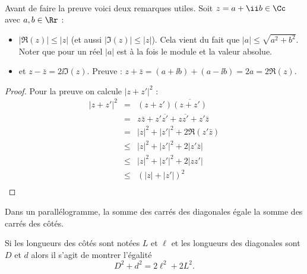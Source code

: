 \documentclass[class=report,crop=false]{standalone}
\begin{document}
\begin{proposition}\ 
\end{proposition}
Avant de faire la preuve voici deux remarques utiles. Soit $z = a +\ii b \in \Cc$ avec $a,b\in\Rr$ :
\begin{itemize}
  \item $|\Re(z)| \le |z|$ (et aussi $|\Im(z)| \le |z|$). Cela vient du fait que
  $|a| \le \sqrt{a^2+b^2}$. Noter que pour un réel $|a|$ est à la fois le module et la valeur absolue. 
  \item \myboxinline{$z+\bar{z} = 2\Re(z)$} et $z-\bar{z} = 2\ii\Im(z)$. Preuve :
  $z+\bar{z} = (a+\ii b)+ (a-\ii b) = 2a = 2\Re(z)$.
\end{itemize}

\begin{proof}
Pour la preuve on calcule $|z+z'|^2$ :
\begin{eqnarray*}
|z+z'|^2 
 &=& \left( z + z'\right)  \overline{\left( z + z' \right)} \\
 &=& z \bar{z} + z'  \overline{z'} + z \overline{z'} + z'  \bar{z}  \\
 &=& |z|^2 + |z'|^2 + 2\Re(z'  \bar{z}) \\
 &\le& |z|^2 + |z'|^2 + 2|z'\bar{z}| \\
 &\le& |z|^2 + |z'|^2 + 2|zz'| \\ 
 &\le& (|z| + |z'|)^2 \\  
\end{eqnarray*}
\end{proof}


\begin{exemple}
  Dans un parallélogramme, la somme des carrés des diagonales égale la
  somme des carrés des c\^otés.
\end{exemple}


Si les longueurs des côtés sont notées $L$ et $\ell$ et les longueurs des diagonales sont $D$ et $d$
alors il s'agit de montrer l'\'egalit\'e
$$D^2+d^2 = 2\ell^2+2L^2.$$
\end{document}

